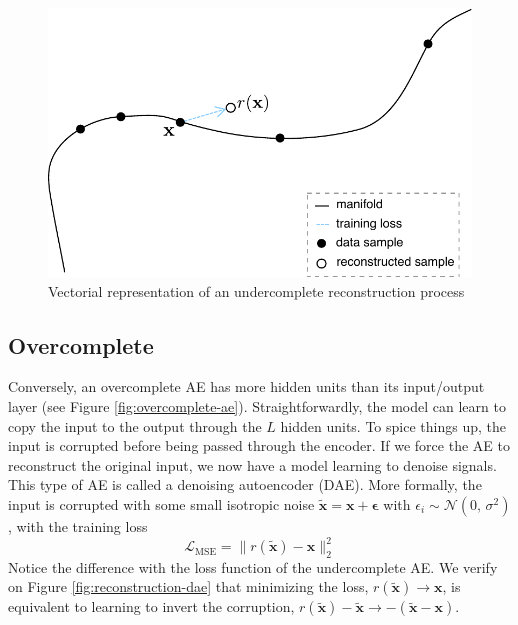\begin{figure}[!h]
\centering
\includegraphics[scale=0.55]{figures/reconstruction}
\caption[Vectorial representation of undercomplete AE]{Vectorial representation of an undercomplete reconstruction process}
\label{fig:reconstruction}
\end{figure}

\subsection*{Overcomplete}
Conversely, an overcomplete AE has more hidden units than its input/output layer (see Figure \ref{fig:overcomplete-ae}). Straightforwardly, the model can learn to copy the input to the output through the $L$ hidden units. To spice things up, the input is corrupted before being passed through the encoder. If we force the AE to reconstruct the original input, we now have a model learning to denoise signals. This type of AE is called a denoising autoencoder (DAE). More formally, the input is corrupted with some small isotropic noise $\tilde{\mathbf{x}} = \mathbf{x} + \mathbf{\epsilon}$ with $\epsilon_i \sim \mathcal{N}(0,\,\sigma^{2})$, with the training loss 
\begin{equation}
\mathcal{L}_{\text{MSE}} = \lVert r(\tilde{\mathbf{x}}) - \mathbf{x} \rVert_2^2
\end{equation}
Notice the difference with the loss function of the undercomplete AE. We verify on Figure \ref{fig:reconstruction-dae} that minimizing the loss, $r(\tilde{\mathbf{x}}) \rightarrow \mathbf{x}$, is equivalent to learning to invert the corruption, $r(\tilde{\mathbf{x}}) - \tilde{\mathbf{x}} \rightarrow -(\tilde{\mathbf{x}} - \mathbf{x})$.

